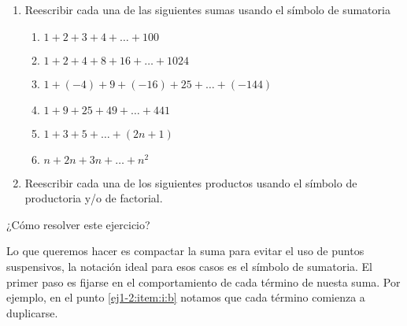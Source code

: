 \begin{enunciado}{\ejercicio}
  \begin{enumerate}[label=\roman*)]
    \item Reescribir cada una de las siguientes sumas usando el símbolo de sumatoria
          \begin{multicols}{2}
            \begin{enumerate}[label=\alph*)]
              \item  $1 + 2 + 3 + 4 + \dots + 100$
              \item  $1 + 2 + 4 + 8 + 16 + \dots + 1024$
              \item  $1 + (-4) + 9 + (-16) + 25 + \dots + (-144)$
              \item $1 + 9 + 25 + 49 + \dots + 441$
              \item $1 + 3 + 5 + \dots + (2n + 1)$
              \item $n + 2n + 3n + \dots + n^2$
            \end{enumerate}
          \end{multicols}
    \item  Reescribir cada una de los siguientes productos usando el símbolo de productoria y/o de factorial.
  \end{enumerate}
\end{enunciado}

¿Cómo resolver este ejercicio?\par
Lo que queremos hacer es compactar la suma para evitar el uso
de puntos suspensivos, la notación ideal para esos casos es el símbolo de sumatoria.
El primer paso es fijarse en el comportamiento de cada término de
nuesta suma. Por ejemplo, en el punto \ref{ej1-2:item:i:b} notamos que cada término comienza a
duplicarse.

